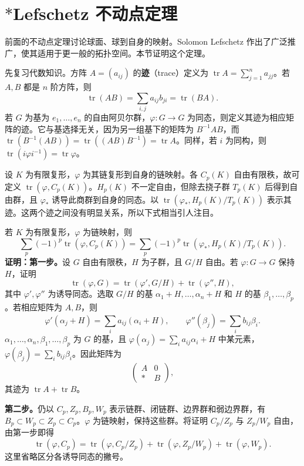 \section{\texorpdfstring{$*$}{*}Lefschetz 不动点定理}
前面的不动点定理讨论球面、球到自身的映射。Solomon Lefschetz 作出了广泛推广，使其适用于更一般的拓扑空间。本节证明这个定理。

先复习代数知识。方阵 $A=(a_{ij})$ 的\textbf{迹}（trace）定义为 $\operatorname{tr}A=\sum_{j=1}^n a_{jj}$。若 $A,B$ 都是 $n$ 阶方阵，则
\[
\operatorname{tr}(AB)=\sum_{i,j}a_{ij}b_{ji}=\operatorname{tr}(BA).
\]
若 $G$ 为基为 $e_1,\ldots,e_n$ 的自由阿贝尔群，$\varphi:G\to G$ 为同态，则定义其迹为相应矩阵的迹。它与基选择无关，因为另一组基下的矩阵为 $B^{-1}AB$，而 $\operatorname{tr}(B^{-1}(AB))=\operatorname{tr}((AB)B^{-1})=\operatorname{tr}A$。同样，若 $i$ 为同构，则 $\operatorname{tr}(i\varphi i^{-1})=\operatorname{tr}\varphi$。

设 $K$ 为有限复形，$\varphi$ 为其链复形到自身的链映射。各 $C_p(K)$ 自由有限秩，故可定义 $\operatorname{tr}(\varphi,C_p(K))$。$H_p(K)$ 不一定自由，但除去挠子群 $T_p(K)$ 后得到自由群，且 $\varphi_*$ 诱导此商群到自身的同态。以 $\operatorname{tr}(\varphi_*,H_p(K)/T_p(K))$ 表示其迹。这两个迹之间没有明显关系，所以下式相当引人注目。

若 $K$ 为有限复形，$\varphi$ 为链映射，则
\[
\sum_p(-1)^p\operatorname{tr}(\varphi,C_p(K))
=\sum_p(-1)^p\operatorname{tr}(\varphi_*,H_p(K)/T_p(K)).
\]
\noindent\textbf{证明：第一步。}设 $G$ 自由有限秩，$H$ 为子群，且 $G/H$ 自由。若 $\varphi:G\to G$ 保持 $H$，证明
\[
\operatorname{tr}(\varphi,G)=\operatorname{tr}(\varphi',G/H)+\operatorname{tr}(\varphi'',H),
\]
其中 $\varphi',\varphi''$ 为诱导同态。选取 $G/H$ 的基 $\alpha_1+H,\ldots,\alpha_n+H$ 和 $H$ 的基 $\beta_1,\ldots,\beta_p$。若相应矩阵为 $A,B$，则
\[
\varphi'(\alpha_j+H)=\sum_i a_{ij}(\alpha_i+H),\qquad
\varphi''(\beta_j)=\sum_i b_{ij}\beta_i.
\]
$\alpha_1,\ldots,\alpha_n,\beta_1,\ldots,\beta_p$ 为 $G$ 的基，且 $\varphi(\alpha_j)=\sum_i a_{ij}\alpha_i+H\text{ 中某元素}$，$\varphi(\beta_j)=\sum_i b_{ij}\beta_i$。因此矩阵为
\[
\begin{pmatrix}A&0\\ *&B\end{pmatrix},
\]
其迹为 $\operatorname{tr}A+\operatorname{tr}B$。

\textbf{第二步。}仍以 $C_p,Z_p,B_p,W_p$ 表示链群、闭链群、边界群和弱边界群，有 $B_p\subset W_p\subset Z_p\subset C_p$。$\varphi$ 为链映射，保持这些群。将证明 $C_p/Z_p$ 与 $Z_p/W_p$ 自由，由第一步即得
\[
\operatorname{tr}(\varphi,C_p)=\operatorname{tr}(\varphi,C_p/Z_p)
+\operatorname{tr}(\varphi,Z_p/W_p)+\operatorname{tr}(\varphi,W_p).\tag{i}
\]
这里省略区分各诱导同态的撇号。

